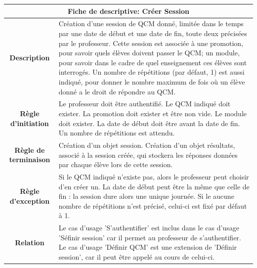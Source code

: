 \documentclass[10pt,a4paper,titlepage]{report}
\begin{document}
\begin{tabular}{|c|p{8cm}|}
	\hline 
	\multicolumn{2}{|c|}{\textbf{Fiche de descriptive: Créer Session}} \\ 
	\hline 
	\textbf{Description} & Création d'une session de QCM donné, limitée dans le temps par une date de début et
	une date de fin, toute deux précisées par le professeur. Cette session est associée 
	à une promotion, pour savoir quels élèves doivent passer le QCM; un module, pour 
	savoir dans le cadre de quel enseignement ces élèves sont interrogés. Un nombre de 
	répétitions (par défaut, 1) est aussi indiqué, pour donner le nombre maximum de fois
	où un élève donné a le droit de répondre au QCM.
 \\  
	\hline
	\textbf{Règle d'initiation} & Le professeur doit être authentifié.
	Le QCM indiqué doit exister.
	La promotion doit exister et être non vide.
	Le module doit exister.
	La date de début doit être avant la date de fin.
	Un nombre de répétitions est attendu. \\ 
	\hline 
	\textbf{Règle de terminaison} & Création d'un objet session.
	Création d'un objet résultats, associé à la session créée, qui stockera les réponses
	données par chaque élève lors de cette session.
 \\ 
	\hline 
	\textbf{Règle d'exception} & 
	Si le QCM indiqué n'existe pas, alors le professeur peut choisir d'en créer un.
	La date de début peut être la même que celle de fin : la session dure alors une
	unique journée.
	Si le aucune nombre de répétitions n'est précisé, celui-ci est fixé par défaut à 1.
 \\ 
	\hline 
	\textbf{Relation} & Le cas d'usage 'S'authentifier' est inclus dans le cas d'usage 'Séfinir session' car il 
	permet au professeur de s'authentifier.
	Le cas d'usage 'Définir QCM' est une extension de 'Définir session', car il peut être appelé
	au cours de celui-ci.
 \\ 
	\hline 
	\end{tabular} 	\newline
	\newline
	
\end{document}
